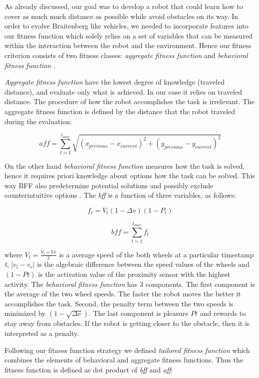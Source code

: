 \documentclass[format=acmsmall, review=false, screen=true]{acmart}
\begin{document}
As already discussed, our goal was to develop a robot that could learn how to cover as much much distance as possible while avoid obstacles on its way. In order to evolve Braitenberg like vehicles, we needed to incorporate features into our fitness function which solely relies on a set of variables that can be measured within the interaction between the robot and the environment. Hence our fitness criterion consists of two fitness classes: \emph{aggregate fitness function} and \emph{behavioral fitness function} \cite{divband2015effect}.

\emph{Aggregate fitness function} have the lowest degree of knowledge (traveled distance), and evaluate only what is achieved. In our case it relies on traveled distance. The procedure of how the robot accomplishes the task is irrelevant. The aggregate fitness function is defined by the distance that the robot traveled during the evaluation:

\[ aff = \sum_{t=1}^{t_{max}} \sqrt{(x_{previous} - x_{current})^2 + (y_{previous} - y_{current})^2} \]

On the other hand \emph{behavioral fitness function} measures how the task is solved, hence it requires priori knowledge about options how the task can be solved. This way BFF also predetermine potential solutions and possibly exclude counterintuitive options \cite{divband2015effect}. The \emph{bff} is a function of three variables, as follows:


\[ f_{t} = V_{t} (1-\Delta v) (1 - P_{t}) \]

\[ bff = \sum_{t=1}^{t_{max}} f_{t} \]


where \(V_{t} = \frac{V_{l} + V_{}r}{2} \) is a average speed of the both wheels at a particular timestamp \emph{t}, \(|v_{l} - v_{r}|\) is the algebraic difference between the speed values of the wheels and \((1 - P{t})\) is the activation value of the proximity sensor with the highest activity. The \emph{behavioral fitness function} has 3 components. The first component is the average of the two wheel speeds. The faster the robot moves the better it accomplishes the task. Second, the penalty term between the two speeds is minimized by \((1-\sqrt{\Delta v})\). The last component is pleasure \(P{t}\) and rewards to stay away from obstacles. If the robot is getting closer to the obstacle, then it is interpreted as a penalty.

Following our fitness function strategy we defined \emph{tailored fitness function} which combines the elements of behavioral and aggregate fitness functions. Thus the fitness function is defined as dot product of \emph{bff} and \emph{aff}:
\end{document}
